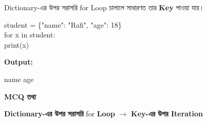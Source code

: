

Dictionary-এর উপর সরাসরি
\textenglish{\ttfamily for}
Loop চালালে সাধারণত তার \textbf{Key} পাওয়া যায়।

\begin{codebox}
\begin{english}
\ttfamily
student = \{"name": "Rafi", "age": 18\}\\
for x in student:\\
\hspace*{4mm}print(x)
\end{english}
\end{codebox}

\textbf{Output:}

\begin{center}
\textenglish{\ttfamily name \qquad age}
\end{center}

\begin{rememberbox}

\textbf{\color{deepOrange}MCQ তথ্য}

\begin{center}

\textbf{Dictionary-এর উপর সরাসরি}
\textenglish{\ttfamily for}
\textbf{Loop}
\(\longrightarrow\)
\textbf{Key-এর উপর Iteration}

\end{center}

\end{rememberbox}



